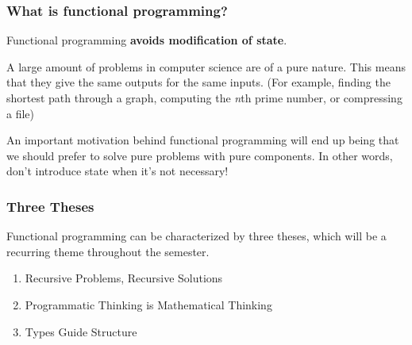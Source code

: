 \documentclass[aspectratio=169, handout]{beamer}
\begin{document}
\begin{frame}[fragile]
  \frametitle{What is functional programming?}

  Functional programming \textbf{avoids modification of state}.

  \pause
  \vspace{\fill}


  \pause
  \vspace{\fill}

  A large amount of problems in computer science are of a pure nature. This means that they
  give the same outputs for the same inputs.
  (For example, finding the shortest path through a graph, computing the \textit{n}th prime
  number, or compressing a file)

  \pause
  \vspace{5pt}

  An important motivation behind functional programming will end up being that we should
  prefer to solve pure problems with pure components. In other words, don't introduce state
  when it's not necessary!
\end{frame}

\begin{frame}[fragile]
  \frametitle{Three Theses}
  \vspace{\fill}

  Functional programming can be characterized by three theses, which will be a recurring
  theme throughout the semester.

  \pause

  \vspace{\fill}

  { \Large
  \begin{enumerate}
    \item Recursive Problems, Recursive Solutions
    \pause
    \vspace{\fill}
    \item Programmatic Thinking is Mathematical Thinking
    \pause
    \vspace{\fill}
    \item Types Guide Structure
  \end{enumerate}
  }

\end{frame}
\end{document}

